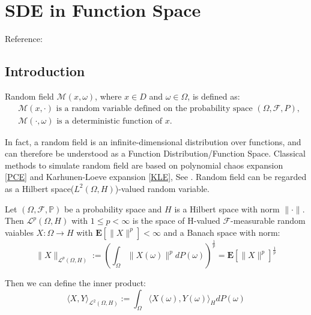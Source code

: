 \chapter{SDE in Function Space}
Reference: \cite{Prato_Zabczyk_2014, Lord_Powell_Shardlow_2014, Kolmogorov_Equations_for_Stochastic_PDEs}
\section{Introduction}
\begin{definition}
    Random field $\mathcal{M}(x, \omega)$, where $x\in D$ and $\omega \in \Omega$, is defined as:
\begin{equation}
    \begin{aligned}
        & \mathcal{M}(x, \cdot) \text{ is a random variable defined on the probability space } (\Omega, \mathcal{F}, P),\\
        & \mathcal{M}(\cdot, \omega) \text{ is a deterministic function of } x.
    \end{aligned}
\end{equation}
\end{definition}
In fact, a random field is an infinite-dimensional distribution over functions, and can therefore be understood as a Function Distribution/Function Space. 
Classical methods to simulate random field are based on polynomial chaos expansion \ref{PCE} and Karhunen-Loeve expansion \ref{KLE}, See \cite{Lord_Powell_Shardlow_2014}.
Random field can be regarded as a Hilbert space($L^2(\Omega, H)$)-valued random variable.
\begin{definition}
  Let $(\Omega, \mathcal{F}, \mathbb{P})$ be a probability space and $H$ is a Hilbert space with norm $\|\cdot\|$. Then $\mathcal{L}^p(\Omega, H)$ with $1\leq p<\infty$ is the space
  of H-valued $\mathcal{F}$-measurable random vaiables $X:\Omega\rightarrow H$ with $\mathbf{E}[\|X\|^p]<\infty$ and a Banach space with norm:
  \begin{equation}
      \|X\|_{\mathcal{L}^p(\Omega, H)}:=\left(\int_\Omega \|X(\omega)\|^pdP(\omega)\right)^{\frac{1}{p}}=\mathbf{E}[\|X\|^p]^{\frac{1}{p}}
  \end{equation}
\end{definition}
Then we can define the inner product: 
\begin{equation}
  \langle X, Y\rangle_{\mathcal{L}^2(\Omega, H)}:=\int_\Omega \langle X(\omega), Y(\omega)\rangle_H dP(\omega)
\end{equation}

